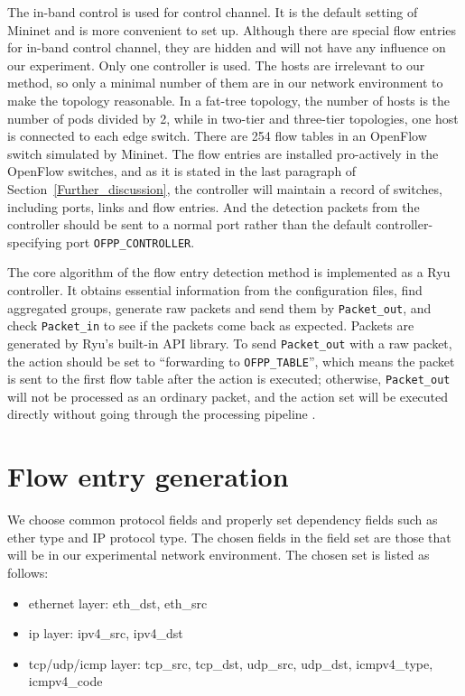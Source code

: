 The in-band control is used for control channel. It is the default setting of Mininet and is more convenient to set up. Although there are special flow entries for in-band control channel, they are hidden and will not have any influence on our experiment. Only one controller is used. The hosts are irrelevant to our method, so only a minimal number of them are in our network environment to make the topology reasonable. In a fat-tree topology, the number of hosts is the number of pods divided by 2, while in two-tier and three-tier topologies, one host is connected to each edge switch. There are 254 flow tables in an OpenFlow switch simulated by Mininet. The flow entries are installed pro-actively in the OpenFlow switches, and as it is stated in the last paragraph of Section~\ref{Further_discussion}, the controller will maintain a record of switches, including ports, links and flow entries. And the detection packets from the controller should be sent to a normal port rather than the default controller-specifying port \texttt{OFPP\_CONTROLLER}.

The core algorithm of the flow entry detection method is implemented as a Ryu controller. It obtains essential information from the configuration files, find aggregated groups, generate raw packets and send them by \texttt{Packet\_out}, and check \texttt{Packet\_in} to see if the packets come back as expected. Packets are generated by Ryu's built-in API library. To send \texttt{Packet\_out} with a raw packet, the action should be set to ``forwarding to \texttt{OFPP\_TABLE}'', which means the packet is sent to the first flow table after the action is executed; otherwise, \texttt{Packet\_out} will not be processed as an ordinary packet, and the action set will be executed directly without going through the processing pipeline \cite{PACKETOUT}. 

\section{Flow entry generation}
\label{flow_entry_generation}
We choose common protocol fields and properly set dependency fields such as ether type and IP protocol type. The chosen fields in the field set are those that will be in our experimental network environment. The chosen set is listed as follows:

\begin{itemize}
\item
ethernet layer: eth\_dst, eth\_src
\item
ip layer: ipv4\_src, ipv4\_dst
\item
tcp/udp/icmp layer: tcp\_src, tcp\_dst, udp\_src, udp\_dst, icmpv4\_type, icmpv4\_code
\end{itemize}


